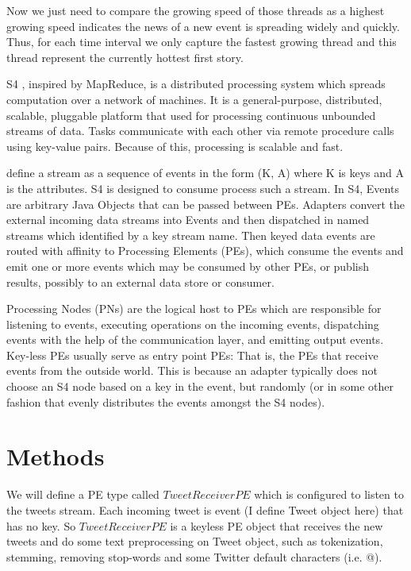 \documentclass[a4paper,12pt]{article}
\begin{document}
Now we just need to compare the growing speed of those threads as a highest growing speed indicates the news of a new event is spreading widely and quickly. Thus, for each time interval we only capture the fastest growing thread and this thread represent the currently hottest first story. \newline



S4 , inspired by MapReduce, is a distributed processing system which spreads computation over a network of machines. It is a general-purpose, distributed, scalable, pluggable platform that used for processing continuous unbounded streams of data. Tasks communicate with each other via remote procedure calls using key-value pairs. Because of this, processing is scalable and fast. \newline



\citep{5693297} define a stream as a sequence of events in the form (K, A) where K is keys and A is the  attributes. S4 is designed to consume process such a stream. In S4, Events are arbitrary Java Objects that can be passed between PEs. Adapters convert the external incoming data streams into Events and then dispatched in named streams which identified by a key stream name. Then keyed data events are routed with affinity to Processing Elements (PEs), which consume the events and emit one or more events which may be consumed by other PEs, or publish results, possibly to an external data store or consumer.\newline

Processing Nodes (PNs) are the logical host to PEs which are responsible for listening to events, executing operations on the incoming events, dispatching events with the help of the communication layer, and emitting output events. Key-less PEs usually serve as entry point PEs: That is, the PEs that receive events from the outside world. This is because an adapter typically does not choose an S4 node based on a key in the event, but randomly (or in some other fashion that evenly distributes the events amongst the S4 nodes).\newline




\section{Methods}


We will define a PE type called $TweetReceiverPE$ which is configured to listen to the tweets stream. Each incoming tweet is event (I define Tweet object here) that has no key. So $TweetReceiverPE$ is a keyless PE object that receives the new tweets and do some text preprocessing on Tweet object, such as tokenization, stemming, removing stop-words and some Twitter default characters (i.e. @). \newline
\end{document}
